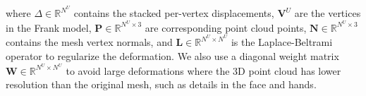 where $\Delta\in\mathds{R}^{N^U}$ contains the stacked per-vertex displacements, $\mathbf{V}^U$ are the vertices in the Frank model, $\mathbf{P}\in\mathds{R}^{N^U\times 3}$ are corresponding point cloud points, $\mathbf{N}\in\mathds{R}^{N^U\times 3}$ contains the mesh vertex normals, and $\mathbf{L}\in\mathds{R}^{N^U\times N^U}$ is the Laplace-Beltrami operator to regularize the deformation. We also use a diagonal weight matrix $\mathbf{W}\in\mathds{R}^{N^U\times N^U}$ to avoid large deformations where the 3D point cloud has lower resolution than the original mesh, such as details in the face and hands. %


